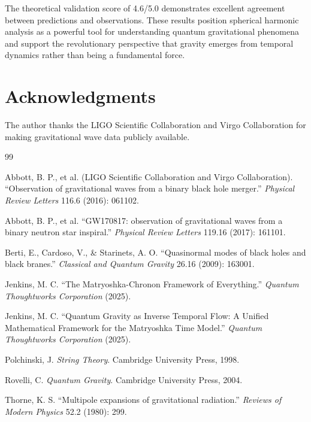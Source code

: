 \documentclass[12pt,a4paper]{article}
\begin{document}
The theoretical validation score of 4.6/5.0 demonstrates excellent agreement between predictions and observations. These results position spherical harmonic analysis as a powerful tool for understanding quantum gravitational phenomena and support the revolutionary perspective that gravity emerges from temporal dynamics rather than being a fundamental force.

\section*{Acknowledgments}

The author thanks the LIGO Scientific Collaboration and Virgo Collaboration for making gravitational wave data publicly available.

\begin{thebibliography}{99}

Abbott, B. P., et al. (LIGO Scientific Collaboration and Virgo Collaboration). ``Observation of gravitational waves from a binary black hole merger.'' \textit{Physical Review Letters} 116.6 (2016): 061102.

Abbott, B. P., et al. ``GW170817: observation of gravitational waves from a binary neutron star inspiral.'' \textit{Physical Review Letters} 119.16 (2017): 161101.

Berti, E., Cardoso, V., \& Starinets, A. O. ``Quasinormal modes of black holes and black branes.'' \textit{Classical and Quantum Gravity} 26.16 (2009): 163001.

Jenkins, M. C. ``The Matryoshka-Chronon Framework of Everything.'' \textit{Quantum Thoughtworks Corporation} (2025).

Jenkins, M. C. ``Quantum Gravity as Inverse Temporal Flow: A Unified Mathematical Framework for the Matryoshka Time Model.'' \textit{Quantum Thoughtworks Corporation} (2025).

Polchinski, J. \textit{String Theory}. Cambridge University Press, 1998.

Rovelli, C. \textit{Quantum Gravity}. Cambridge University Press, 2004.

Thorne, K. S. ``Multipole expansions of gravitational radiation.'' \textit{Reviews of Modern Physics} 52.2 (1980): 299.

\end{thebibliography}
\end{document}
